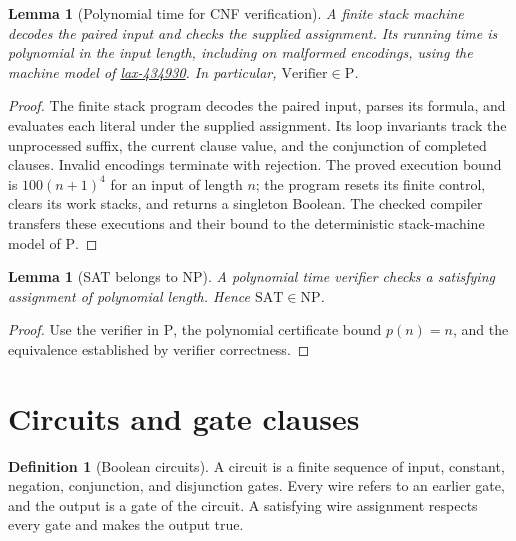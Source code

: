 \documentclass[11pt]{article}
\newtheorem{lemma}[theorem]{Lemma}
\theoremstyle{definition}
\newtheorem{definition}[theorem]{Definition}
\begin{document}
\begin{lemma}[Polynomial time for CNF verification]\leavevmode
A finite stack machine decodes the paired input and checks the supplied
assignment. Its running time is polynomial in the input length, including
on malformed encodings, using the machine model of
\href{https://laxarchive.org/lax-434930/}{lax-434930}.
In particular, $\mathrm{Verifier}\in\mathrm P$.
\end{lemma}
\begin{proof}\leavevmode
The finite stack program decodes the paired input, parses its formula, and evaluates each literal under the supplied assignment. Its loop invariants track the unprocessed suffix, the current clause value, and the conjunction of completed clauses. Invalid encodings terminate with rejection. The proved execution bound is $100(n+1)^4$ for an input of length $n$; the program resets its finite control, clears its work stacks, and returns a singleton Boolean. The checked compiler transfers these executions and their bound to the deterministic stack-machine model of $\mathrm P$.\qedhere
\end{proof}

\begin{lemma}[SAT belongs to NP]\leavevmode
A polynomial time verifier checks a satisfying assignment of polynomial length.
Hence $\mathrm{SAT}\in\mathrm{NP}$.
\end{lemma}
\begin{proof}\leavevmode
Use the verifier in $\mathrm P$, the polynomial certificate bound $p(n)=n$, and the equivalence established by verifier correctness.\qedhere
\end{proof}

\section{Circuits and gate clauses}

\begin{definition}[Boolean circuits]\leavevmode
A circuit is a finite sequence of input, constant, negation, conjunction,
and disjunction gates. Every wire refers to an earlier gate, and the output
is a gate of the circuit. A satisfying wire assignment respects every gate
and makes the output true.

\end{definition}
\end{document}
